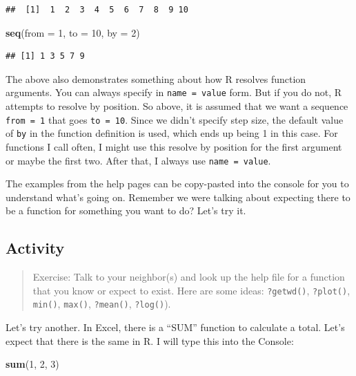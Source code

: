 \documentclass[]{book}
\newenvironment{Shaded}{\begin{snugshade}}{\end{snugshade}}
\newcommand{\DataTypeTok}[1]{\textcolor[rgb]{0.13,0.29,0.53}{#1}}
\newcommand{\DecValTok}[1]{\textcolor[rgb]{0.00,0.00,0.81}{#1}}
\newcommand{\KeywordTok}[1]{\textcolor[rgb]{0.13,0.29,0.53}{\textbf{#1}}}
\newcommand{\NormalTok}[1]{#1}
\begin{document}
\begin{verbatim}
##  [1]  1  2  3  4  5  6  7  8  9 10
\end{verbatim}

\begin{Shaded}
\begin{Highlighting}[]
\KeywordTok{seq}\NormalTok{(}\DataTypeTok{from =} \DecValTok{1}\NormalTok{, }\DataTypeTok{to =} \DecValTok{10}\NormalTok{, }\DataTypeTok{by =} \DecValTok{2}\NormalTok{)}
\end{Highlighting}
\end{Shaded}

\begin{verbatim}
## [1] 1 3 5 7 9
\end{verbatim}

The above also demonstrates something about how R resolves function arguments. You can always specify in \texttt{name\ =\ value} form. But if you do not, R attempts to resolve by position. So above, it is assumed that we want a sequence \texttt{from\ =\ 1} that goes \texttt{to\ =\ 10}. Since we didn't specify step size, the default value of \texttt{by} in the function definition is used, which ends up being 1 in this case. For functions I call often, I might use this resolve by position for the first
argument or maybe the first two. After that, I always use \texttt{name\ =\ value}.

The examples from the help pages can be copy-pasted into the console for you to understand what's going on. Remember we were talking about expecting there to be a function for something you want to do? Let's try it.

\hypertarget{activity}{%
\subsection{Activity}\label{activity}}

\begin{quote}
Exercise: Talk to your neighbor(s) and look up the help file for a function that you know or expect to exist. Here are some ideas: \texttt{?getwd()}, \texttt{?plot()}, \texttt{min()}, \texttt{max()}, \texttt{?mean()}, \texttt{?log()}).
\end{quote}

Let's try another. In Excel, there is a ``SUM'' function to calculate a total. Let's expect that there is the same in R. I will type this into the Console:

\begin{Shaded}
\begin{Highlighting}[]
\KeywordTok{sum}\NormalTok{(}\DecValTok{1}\NormalTok{, }\DecValTok{2}\NormalTok{, }\DecValTok{3}\NormalTok{)}
\end{Highlighting}
\end{Shaded}
\end{document}
